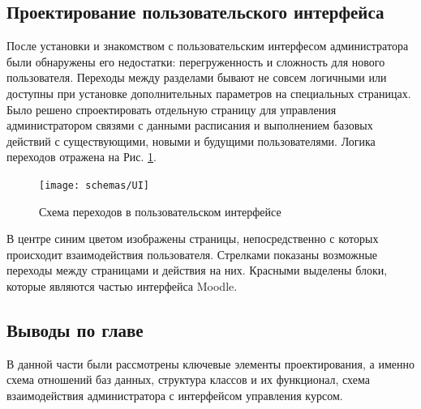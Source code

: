 \documentclass[a4paper,14pt]{article}
\begin{document}
\subsection{Проектирование пользовательского интерфейса}

После установки и знакомством с пользовательским интерфесом администратора были обнаружены его недостатки: перегруженность и сложность для нового пользователя.
Переходы между разделами бывают не совсем логичными или доступны при установке дополнительных параметров на специальных страницах.
Было решено спроектировать отдельную страницу для управления администратором связями с данными расписания и выполнением базовых действий с существующими, новыми и будущими пользователями.
Логика переходов отражена на Рис. \ref{img:UI}.

\begin{figure}[H]
	\centering		
	\texttt{[image: schemas/UI]}
	\caption{Схема переходов в пользовательском интерфейсе}\label{img:UI}
\end{figure}

В центре синим цветом изображены страницы, непосредственно с которых происходит взаимодействия пользователя.
Стрелками показаны возможные переходы между страницами и действия на них.
Красными выделены блоки, которые являются частью интерфейса Moodle.






\subsection{Выводы по главе}

В данной части были рассмотрены ключевые элементы проектирования, а именно схема отношений баз данных, структура классов и их функционал, схема взаимодействия администратора с интерфейсом управления курсом.







\end{document}
